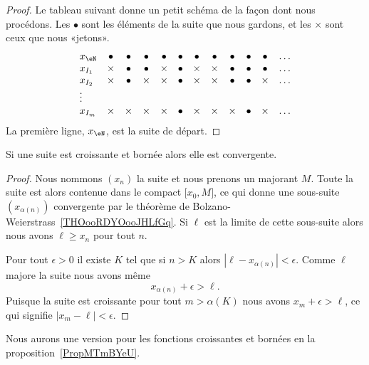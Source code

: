 \begin{proof}
	Le tableau suivant donne un petit schéma de la façon dont nous procédons. Les \( \bullet\) sont les éléments de la suite que nous gardons, et les \( \times\) sont ceux que nous «jetons».
	\begin{equation}
		\begin{array}{lccccccccccc}
			x_{\eN} & \bullet & \bullet & \bullet & \bullet & \bullet & \bullet & \bullet & \bullet & \bullet & \bullet & \ldots \\
			x_{I_1} & \times  & \bullet & \bullet & \times  & \bullet & \times  & \times  & \bullet & \bullet & \bullet & \ldots \\
			x_{I_2} & \times  & \bullet & \times  & \times  & \bullet & \times  & \times  & \bullet & \bullet & \times  & \ldots \\
			\vdots                                                                                                               \\
			x_{I_m} & \times  & \times  & \times  & \times  & \bullet & \times  & \times  & \times  & \bullet & \times  & \ldots
		\end{array}
	\end{equation}
	La première ligne, \( x_{\eN}\), est la suite de départ.
\end{proof}

\begin{corollary}   \label{CorFHbMqGGyi}
	Si une suite est croissante et bornée alors elle est convergente.
\end{corollary}

\begin{proof}
	Nous nommons \( (x_n)\) la suite et nous prenons un majorant \( M\). Toute la suite est alors contenue dans le compact \( \mathopen[ x_0 , M \mathclose]\), ce qui donne une sous-suite \( (x_{\alpha(n)})\) convergente par le théorème de Bolzano-Weierstrass~\ref{THOooRDYOooJHLfGq}. Si \( \ell\) est la limite de cette sous-suite alors nous avons \( \ell\geq x_n\) pour tout \( n\).

	Pour tout \( \epsilon>0\) il existe \( K\) tel que si \( n>K\) alors \( | \ell-x_{\alpha(n)} |<\epsilon\). Comme \( \ell\) majore la suite nous avons même
	\begin{equation}
		x_{\alpha(n)}+\epsilon>\ell.
	\end{equation}
	Puisque la suite est croissante pour tout \( m>\alpha(K)\) nous avons \( x_m+\epsilon>\ell\), ce qui signifie \( | x_m-\ell |<\epsilon\).
\end{proof}
Nous aurons une version pour les fonctions croissantes et bornées en la proposition~\ref{PropMTmBYeU}.

